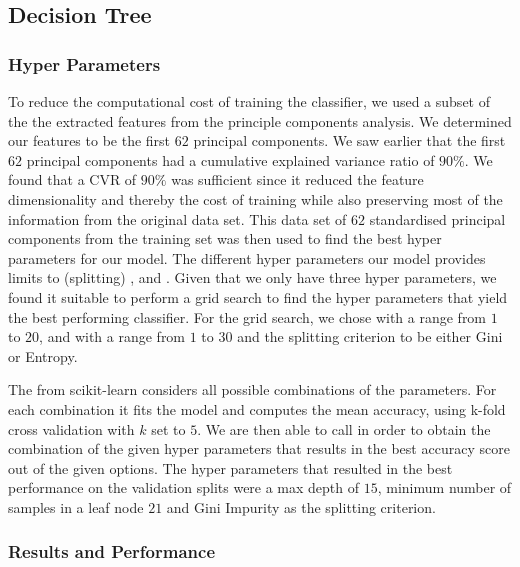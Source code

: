 \documentclass[../main.tex]{subfiles}
\begin{document}
\subsection{Decision Tree}

\subsubsection{Hyper Parameters}

To reduce the computational cost of training the classifier, we 
used a subset of the the extracted features from the principle 
components analysis. We determined our features to be the first 
$62$ principal components. We saw earlier that the first $62$ 
principal components had a cumulative explained variance ratio of $90\%$. 
We found that a CVR of $90\%$ was sufficient since it reduced the feature 
dimensionality and thereby the cost of training while also 
preserving most of the information from the original data set.
This data set of $62$ standardised principal components from 
the training set was then used to find the best hyper parameters 
for our model. 
The different hyper parameters our model provides limits to 
(splitting) ,  and 
. 
Given that we only have three hyper parameters, we found it 
suitable to perform a grid search to find the hyper parameters 
that yield the best performing classifier. 
For the grid search, we chose  with a range 
from $1$ to $20$, and  with a range 
from $1$ to $30$ and the splitting criterion to be either Gini or 
Entropy.

The  from scikit-learn considers all 
possible combinations of the parameters. For each combination it 
fits the model and computes the mean accuracy, using k-fold cross 
validation with $k$ set to $5$. We are then able to call 
 in order to obtain the combination of 
the given hyper parameters that results in the best accuracy 
score out of the given options. 
The hyper parameters that resulted in the best performance on the 
validation splits were a max depth of $15$, minimum number of 
samples in a leaf node $21$ and Gini Impurity as the splitting 
criterion. 


\subsubsection{Results and Performance}
\end{document}
